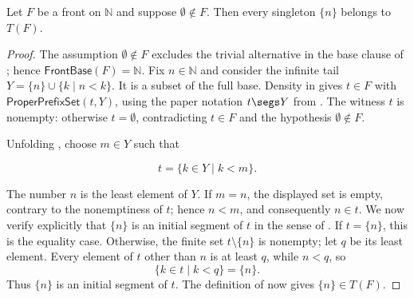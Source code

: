 \begin{lemma}
Let $F$ be a front on $\mathbb N$ and suppose $\emptyset\notin F$.  Then
every singleton $\{n\}$ belongs to $T(F)$.
\end{lemma}
\begin{proof}
The assumption $\emptyset\notin F$ excludes the trivial alternative in the
base clause of ; hence $\mathsf{FrontBase}(F)=\mathbb N$.
Fix $n\in\mathbb N$ and consider the infinite tail
$Y=\{n\}\cup\{k\mid n<k\}$.  It is a subset of the full base.  Density in
 gives $t\in F$ with $\mathsf{ProperPrefixSet}(t,Y)$, using
the paper notation $t\segs Y$ from .  The witness
$t$ is nonempty: otherwise $t=\emptyset$, contradicting $t\in F$ and the
hypothesis $\emptyset\notin F$.

Unfolding , choose $m\in Y$ such that

\[
t=\{k\in Y\mid k<m\}.
\]

The number $n$ is the least element of $Y$.  If $m=n$, the displayed set is
empty, contrary to the nonemptiness of $t$; hence $n<m$, and consequently
$n\in t$.  We now verify explicitly that $\{n\}$ is an initial segment of
$t$ in the sense of .  If $t=\{n\}$, this is the
equality case.  Otherwise, the finite set $t\setminus\{n\}$ is nonempty;
let $q$ be its least element.  Every element of $t$ other than $n$ is at
least $q$, while $n<q$, so
\[
\{k\in t\mid k<q\}=\{n\}.
\]
Thus $\{n\}$ is an initial segment of $t$.  The definition of
 now gives $\{n\}\in T(F)$.
\end{proof}
